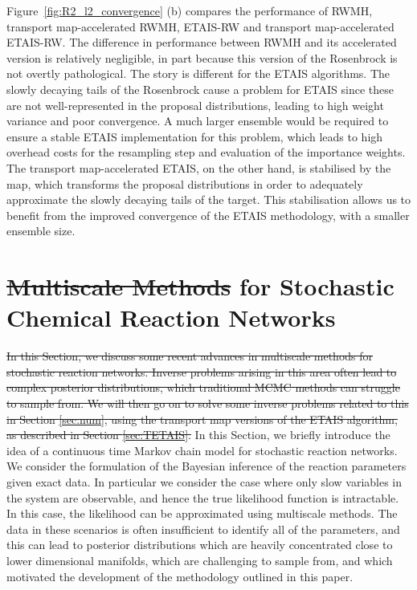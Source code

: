 \documentclass[final]{siamltex}
\newcommand{\edit}[1]{{\color{red} #1}}  %
\providecommand{\DIFadd}[1]{{\protect\color{blue}\uwave{#1}}} %
\providecommand{\DIFdel}[1]{{\protect\color{red}\sout{#1}}}                      %
\providecommand{\DIFaddbegin}{} %
\providecommand{\DIFaddend}{} %
\providecommand{\DIFdelbegin}{} %
\providecommand{\DIFdelend}{} %
\newcommand{\DIFscaledelfig}{0.5}
\newlength{\DIFdelgraphicswidth} %
\newlength{\DIFdelgraphicsheight} %
\newcommand{\DIFaddincludegraphics}[2][]{{\color{blue}\fbox{\DIFOincludegraphics[#1]{#2}}}} %
\newcommand{\DIFdelincludegraphics}[2][]{%
\sbox{\DIFdelgraphicsbox}{\DIFOincludegraphics[#1]{#2}}%
\settoboxwidth{\DIFdelgraphicswidth}{\DIFdelgraphicsbox} %
\settoboxtotalheight{\DIFdelgraphicsheight}{\DIFdelgraphicsbox} %
\scalebox{\DIFscaledelfig}{%
\parbox[b]{\DIFdelgraphicswidth}{\usebox{\DIFdelgraphicsbox}\\[-\baselineskip] \rule{\DIFdelgraphicswidth}{0em}}\llap{\resizebox{\DIFdelgraphicswidth}{\DIFdelgraphicsheight}{%
\setlength{\unitlength}{\DIFdelgraphicswidth}%
\begin{picture}(1,1)%
\thicklines\linethickness{2pt} %
{\color[rgb]{1,0,0}\put(0,0){\framebox(1,1){}}}%
{\color[rgb]{1,0,0}\put(0,0){\line( 1,1){1}}}%
{\color[rgb]{1,0,0}\put(0,1){\line(1,-1){1}}}%
\end{picture}%
}\hspace*{3pt}}} %
} %
\DeclareRobustCommand{\DIFaddbegin}{\DIFOaddbegin \let\includegraphics\DIFaddincludegraphics} %
\DeclareRobustCommand{\DIFaddend}{\DIFOaddend \let\includegraphics\DIFOincludegraphics} %
\DeclareRobustCommand{\DIFdelbegin}{\DIFOdelbegin \let\includegraphics\DIFdelincludegraphics} %
\DeclareRobustCommand{\DIFdelend}{\DIFOaddend \let\includegraphics\DIFOincludegraphics} %
\begin{document}
Figure~\ref{fig:R2_l2_convergence} (b) compares the performance of
RWMH, transport map-accelerated RWMH, ETAIS-RW and transport
map-accelerated ETAIS-RW. The difference in performance between RWMH
and its accelerated version is relatively negligible, in part because
this version of the Rosenbrock is not overtly pathological. The story
is different for the ETAIS algorithms. The slowly decaying tails of
the Rosenbrock cause a problem for ETAIS since these are not
well-represented in the proposal distributions, leading to high weight
variance and poor convergence. A much larger
ensemble would be required to ensure a stable ETAIS implementation for this
problem, which leads to high overhead costs for the resampling step
and evaluation of the importance weights. The transport map-accelerated
ETAIS, on the other hand, is stabilised by the map, which transforms the proposal
distributions in order to adequately approximate the slowly decaying
tails of the target. This stabilisation allows us to benefit from the
improved convergence of the ETAIS methodology, with a smaller ensemble
size. 



\section{\DIFdelbegin \DIFdel{Multiscale Methods }\DIFdelend \DIFaddbegin \DIFadd{Inverse Problems }\DIFaddend for \DIFaddbegin \DIFadd{Multiscale }\DIFaddend Stochastic Chemical Reaction
  Networks}\label{sec:multi}
\DIFdelbegin \DIFdel{In this Section, we discuss some recent advances in multiscale methods
for stochastic reaction networks. Inverse problems arising in this
area often lead to complex posterior
distributions, which traditional MCMC methods can struggle to sample
from. We will then go on to solve some inverse problems related to
this in Section \ref{sec:num}, using the transport map versions of the
ETAIS algorithm, as described in Section \ref{sec:TETAIS}.
}\DIFdelend \DIFaddbegin \edit{In this Section, we briefly introduce the idea of a continuous
  time Markov chain model for stochastic reaction networks. We consider the formulation of the Bayesian inference of
  the reaction parameters given exact data. In particular we consider
  the case where only slow variables in the system are observable, and
  hence the true likelihood function is intractable. In this case, the
  likelihood can be approximated using multiscale methods. The data in
  these scenarios is often insufficient to identify all of the
  parameters, and this can lead to posterior distributions which are
  heavily concentrated close to lower dimensional manifolds, which are
  challenging to sample from, and which motivated the development of
  the methodology outlined in this paper.}
\DIFaddend 
\end{document}
